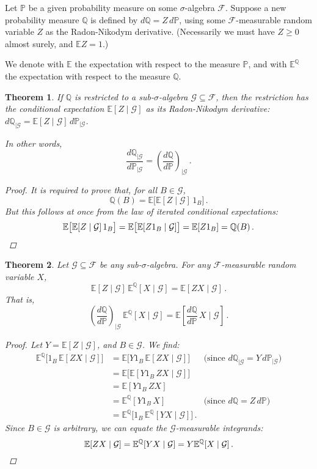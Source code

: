 \documentclass[12pt]{article}
\newtheorem{thm}{Theorem}
\newcommand{\PP}{\mathbb{P}}
\newcommand{\E}{\mathbb{E}}
\newcommand{\EQ}{\mathbb{E}^\mathbb{Q}}
\newcommand{\PQ}{\mathbb{Q}}
\newcommand{\sF}{\mathcal{F}}
\newcommand{\sG}{\mathcal{G}}
\begin{document}
Let $\PP$ be a given probability measure
on some $\sigma$-algebra $\sF$.
Suppose a new probability measure $\PQ$ is defined
by $d\PQ = Z \, d\PP$, using some $\sF$-measurable 
random variable $Z$
as the Radon-Nikodym derivative. 
(Necessarily we must have $Z \geq 0$ almost surely, and $\E Z = 1$.)

We denote with $\E$ the expectation with respect to the measure $\PP$,
and with $\EQ$ the expectation with respect to the measure $\PQ$.

\begin{thm}
If $\PQ$ is restricted to a sub-$\sigma$-algebra
$\sG \subseteq \sF$,
then the restriction has the conditional expectation
$\E[Z \mid \sG]$ as its Radon-Nikodym derivative:
$d \PQ_{\mid\sG} = \E[ Z \mid \sG ] \, d\PP_{\mid \sG}$.

In other words,
\[
\frac{d\PQ_{\mid \sG}}{d\PP_{\mid \sG}} = \left( \frac{d\PQ}{d\PP}  \right)_{\mid \sG}\,.
\]


\begin{proof}
It is required to prove that, for all $B \in \sG$,
\[
\PQ(B) = \E \bigl[ \E [ Z \mid \sG] \, 1_B  \bigr]\,.
\]
But this follows at once from the law of iterated conditional expectations:
\[
\E \bigl [ \E [ Z \mid \sG ] \, 1_B \bigr]
= 
\E \bigl [ \E [ Z 1_B \mid \sG ] \bigr]
= \E [Z 1_B] = \PQ(B) \,. \qedhere
\]
\end{proof}
\end{thm}


\begin{thm}
Let $\sG \subseteq \sF$ be any sub-$\sigma$-algebra.
For any $\sF$-measurable random variable $X$,
\[
\E [ Z \mid \sG ] \, \EQ [ X \mid \sG]
= \E[ ZX \mid \sG]\,.
\]
That is,
\[
\left(\frac{d\PQ}{d\PP}\right)_{\mid \sG} \,
\EQ [ X \mid \sG ] = 
\E \left[ \frac{d\PQ}{d\PP} \, X \mid \sG \right]\,.
\]

\begin{proof}
Let $Y = \E[Z \mid \sG]$, and 
$B \in \sG$.  We find:
\begin{align*}
\EQ \bigl[ 1_B \, \E[ZX \mid \sG] \bigr] &=
\E \bigl[ Y 1_B \, \E [ ZX \mid \sG] \bigr]
& \text{(since $d \PQ_{\mid \sG} = Y \, d \PP_{\mid \sG}$)} \\
&= \E \bigl[ \E[ Y 1_B \, ZX \mid \sG] \bigr] \\
&= \E [Y 1_B \, ZX ] \\
&= \EQ [ Y 1_B \, X ] & \text{(since $d\PQ = Z \, d\PP$)} \\
&= \EQ \bigl[  1_B \, \EQ[ Y X \mid \sG] \bigr]\,.
\end{align*}
Since $B \in \sG$ is arbitrary, we can equate the $\sG$-measurable integrands:
\[
\E [ ZX \mid \sG ] = \EQ [ YX \mid \sG] = Y \EQ [X \mid \sG]\,.
\qedhere
\]
\end{proof}
\end{thm}
\end{document}
